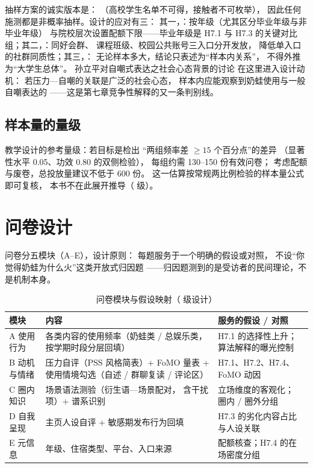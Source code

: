 抽样方案的诚实版本是：
（高校学生名单不可得，接触者不可枚举），
因此任何施测都是非概率抽样。设计的应对有三：
其一，：按年级（尤其区分毕业年级与非毕业年级）
与院校层次设置配额下限——毕业年级是 H7.1 与 H7.3
的关键对比组；其二，：同好会群、
课程班级、校园公共账号三入口分开发放，
降低单入口的社群同质性；其三，：
无论样本多大，结论只表述为“样本内关系”，
不得外推为“大学生总体”。
孙立平对自嘲式表达之社会心态背景的讨论
\cite{sunliping2010} 在这里进入设计动机：
若压力—自嘲的关联是广泛的社会心态，
样本内应能观察到奶蛙使用与一般自嘲表达的
——这是第七章竞争性解释的又一条判别线。

\subsection{样本量的量级}

教学设计的参考量级：若目标是检出
“两组频率差 $\ge 15$ 个百分点”的差异
（显著性水平 0.05、功效 0.80 的双侧检验），
每组约需 130--150 份有效问卷；
考虑配额与废卷，总投放量建议不低于 600 份。
这一估算按常规两比例检验的样本量公式即可复核，
本书不在此展开推导（ 级）。

\section{问卷设计}\label{sec:11:questionnaire}

问卷分五模块（A--E），设计原则：
每题服务于一个明确的假设或对照，
不设“你觉得奶蛙为什么火”这类开放式归因题
——归因题测到的是受访者的民间理论，不是机制本身。

\begin{table}[htbp]\centering
  \caption{问卷模块与假设映射（ 级设计）}
  \label{tab:11:modules}
  \small
  \begin{tabularx}{\textwidth}{@{}lXX@{}}
    \toprule
    模块 & 内容 & 服务的假设 / 对照 \\ \midrule
    A 使用行为 & 各类内容的使用频率（奶蛙类 / 总娱乐类，
      按学期时段分层回填） & H7.1 的选择性上升；
      算法解释的曝光控制 \\
    B 动机与情绪 & 压力自评（PSS 风格简表）+ FoMO 量表 +
      使用情境勾选（自述 / 群聊复读 / 评论区） &
      H7.1、H7.2、H7.4、FoMO 动因 \\
    C 圈内知识 & 场景语法测验（衍生语—场景配对，
      含干扰项）+ 谱系识别 & 立场维度的客观化；
      圈内 / 圈外分组 \\
    D 自我呈现 & 主页人设自评 + 敏感期发布行为回填 &
      H7.3 的劣化内容占比与人设关联 \\
    E 元信息 & 年级、住宿类型、平台、入口来源 &
      配额核查；H7.4 的在场密度分组 \\
    \bottomrule
  \end{tabularx}
\end{table}

